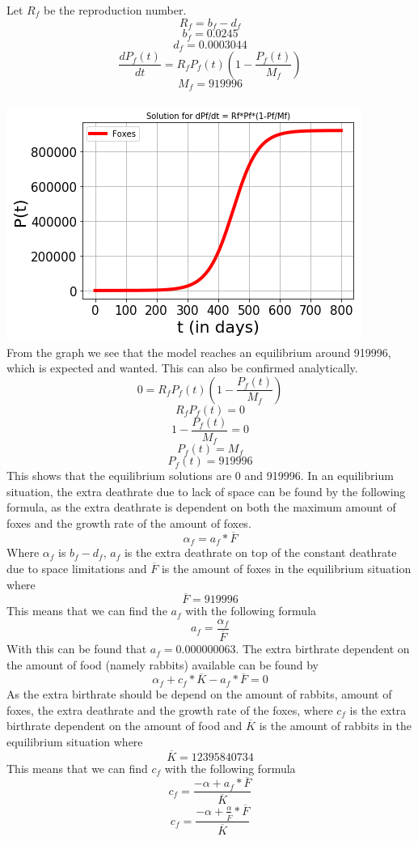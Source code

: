 \documentclass{article}
\begin{document}
Let $R_f$ be the reproduction number.
$$R_f = b_f - d_f$$
$$b_f = 0.0245$$
$$d_f = 0.0003044$$
$$\frac{dP_f(t)}{dt} = R_fP_f(t)(1-\frac{P_f(t)}{M_f})$$
$$M_f = 919996$$
\\
\includegraphics[scale=0.78]{Pictures/Foxes.png}
\\
From the graph we see that the model reaches an equilibrium around 919996, which is expected and wanted. This can also be confirmed analytically.
$$0=R_fP_f(t)(1-\frac{P_f(t)}{M_f})$$
$$R_fP_f(t)=0$$
$$1-\frac{P_f(t)}{M_f}=0$$
$$P_f(t)=M_f$$
$$P_f(t)=919996$$
This shows that the equilibrium solutions are 0 and 919996. In an equilibrium situation, the extra deathrate due to lack of space can be found by the following formula, as the extra deathrate is dependent on both the maximum amount of foxes and the growth rate of the amount of foxes.
$$\alpha_f = a_f * \overline{F}$$
Where $\alpha_f$ is $b_f-d_f$, $a_f$ is the extra deathrate on top of the constant deathrate due to space limitations and $\overline{F}$ is the amount of foxes in the equilibrium situation where
$$\overline{F} = 919996$$
This means that we can find the $a_f$ with the following formula
$$a_f = \frac{\alpha_f}{\overline{F}}$$
With this can be found that $a_f = 0.000000063$. The extra birthrate dependent on the amount of food (namely rabbits) available can be found by
$$\alpha_f + c_f*\overline{K}-a_f*\overline{F}=0$$
As the extra birthrate should be depend on the amount of rabbits, amount of foxes, the extra deathrate and the growth rate of the foxes, where $c_f$ is the extra birthrate dependent on the amount of food and $\overline{K}$ is the amount of rabbits in the equilibrium situation where
$$\overline{K}=12395840734$$
This means that we can find $c_f$ with the following formula
$$c_f=\frac{-\alpha+a_f*\overline{F}}{\overline{K}}$$
$$c_f=\frac{-\alpha+\frac{\alpha}{\overline{F}}*\overline{F}}{\overline{K}}$$
\end{document}
